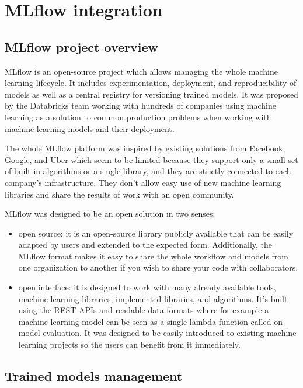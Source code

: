 \chapter{MLflow integration}
\label{chap:mlflow}

\section{MLflow project overview}

MLflow is an open-source project which allows managing the whole machine learning lifecycle.
It includes experimentation, deployment, and reproducibility of models as well as a central registry
for versioning trained models. It was proposed by the Databricks team working with hundreds of companies
using machine learning as a solution to common production problems when working with machine learning
models and their deployment.\cite{mlflowpage}

The whole MLflow platform was inspired by existing solutions from Facebook, Google, and Uber which
seem to be limited because they support only a small set of built-in algorithms or a single library,
and they are strictly connected to each company’s infrastructure. They don’t allow easy use of new
machine learning libraries and share the results of work with an open community.\cite{mlflowarticle}

MLflow was designed to be an open solution in two senses:

\begin{itemize}
    \item open source: it is an open-source library publicly available that can be easily adapted
    by users and extended to the expected form. Additionally, the MLflow format makes it easy to share
    the whole workflow and models from one organization to another if you wish to share your
    code with collaborators.

    \item open interface: it is designed to work with many already available tools, machine learning libraries, implemented libraries, and algorithms. It’s built using the REST APIs and readable data formats where for example a machine learning model can be seen as a single lambda function called on model evaluation. It was designed to be easily introduced to existing machine learning projects so the users can benefit from it immediately.
\end{itemize}

\section{Trained models management}

